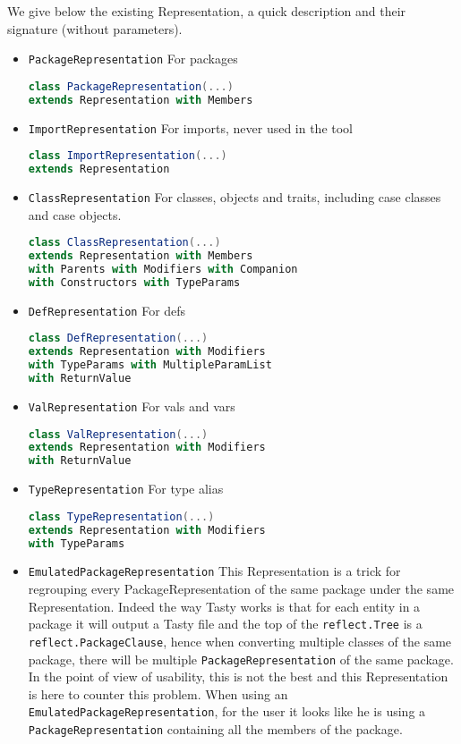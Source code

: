\documentclass{report}
\begin{document}
We give below the existing Representation, a quick description and their signature (without parameters).
\begin{itemize}
    \item \texttt{PackageRepresentation} For packages
\begin{lstlisting}[language=scala]
class PackageRepresentation(...)
extends Representation with Members
\end{lstlisting}
    \item \texttt{ImportRepresentation} For imports, never used in the tool
\begin{lstlisting}[language=scala]
class ImportRepresentation(...)
extends Representation
\end{lstlisting}
    \item \texttt{ClassRepresentation} For classes, objects and traits, including case classes and case objects.
\begin{lstlisting}[language=scala]
class ClassRepresentation(...)
extends Representation with Members
with Parents with Modifiers with Companion
with Constructors with TypeParams
\end{lstlisting}
    \item \texttt{DefRepresentation} For defs
\begin{lstlisting}[language=scala]
class DefRepresentation(...)
extends Representation with Modifiers
with TypeParams with MultipleParamList
with ReturnValue
\end{lstlisting}
    \item \texttt{ValRepresentation} For vals and vars
\begin{lstlisting}[language=scala]
class ValRepresentation(...)
extends Representation with Modifiers
with ReturnValue
\end{lstlisting}
    \item \texttt{TypeRepresentation} For type alias
\begin{lstlisting}[language=scala]
class TypeRepresentation(...)
extends Representation with Modifiers
with TypeParams 
\end{lstlisting}
    \item \texttt{EmulatedPackageRepresentation} This Representation is a trick for regrouping every PackageRepresentation of the same package under the same Representation. Indeed the way Tasty works is that for each entity in a package it will output a Tasty file and the top of the \texttt{reflect.Tree} is a \texttt{reflect.PackageClause}, hence when converting multiple classes of the same package, there will be multiple \texttt{PackageRepresentation} of the same package. In the point of view of usability, this is not the best and this Representation is here to counter this problem. When using an \texttt{EmulatedPackageRepresentation}, for the user it looks like he is using a \texttt{PackageRepresentation} containing all the members of the package.
\end{itemize}
\end{document}
